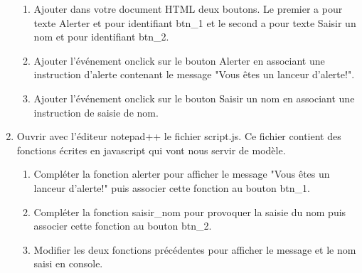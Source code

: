 \documentclass[12pt,a4paper]{article}
\begin{document}
\begin{enumerate}
\begin{enumerate}
\item Ajouter dans votre document HTML deux boutons. Le premier a pour texte \textsf{Alerter} et pour identifiant \textsf{btn\_1} et le second a pour texte \textsf{Saisir un nom} et pour identifiant \textsf{btn\_2}.

\item Ajouter l'événement \textsf{onclick} sur le bouton \textsf{Alerter} en associant une instruction d'alerte contenant le message "Vous êtes un lanceur d'alerte!".

\item Ajouter l'événement \textsf{onclick} sur le bouton \textsf{Saisir un nom} en associant une instruction de saisie de nom.

\end{enumerate}

\item Ouvrir avec l'éditeur \textsf{notepad++} le fichier \textsf{script.js}. Ce fichier contient des fonctions écrites en javascript qui vont nous servir de modèle.

\begin{enumerate}
\item Compléter la fonction \textsf{alerter} pour afficher le message "Vous êtes un lanceur d'alerte!" puis associer cette fonction au bouton \textsf{btn\_1}.

\item Compléter la fonction \textsf{saisir\_nom} pour provoquer la saisie du nom puis associer cette fonction au bouton \textsf{btn\_2}.

\item Modifier les deux fonctions précédentes pour afficher le message et le nom saisi en console.
\end{enumerate}

\end{enumerate}
\end{document}
